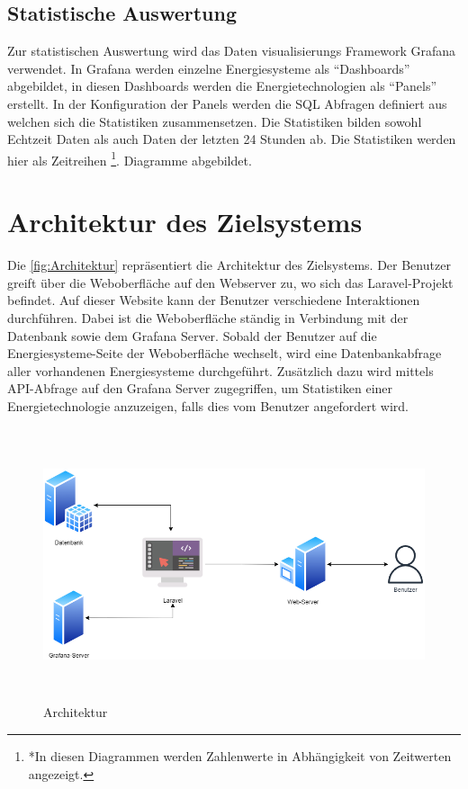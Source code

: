 \subsection{Statistische Auswertung}
Zur statistischen Auswertung wird das Daten visualisierungs Framework Grafana verwendet. In Grafana werden einzelne Energiesysteme als “Dashboards” abgebildet, in diesen Dashboards werden die Energietechnologien als “Panels” erstellt. In der Konfiguration der Panels werden die SQL Abfragen definiert aus welchen sich die Statistiken zusammensetzen. Die Statistiken bilden sowohl Echtzeit Daten als auch Daten der letzten 24 Stunden ab. Die Statistiken werden hier als Zeitreihen \footnote{ *In diesen Diagrammen werden Zahlenwerte in Abhängigkeit von Zeitwerten angezeigt.	
 }. Diagramme abgebildet.


\newpage
\section{Architektur des Zielsystems}
Die \autoref{fig:Architektur} repräsentiert die Architektur des Zielsystems. Der Benutzer greift über die Weboberfläche auf den Webserver zu, wo sich das Laravel-Projekt befindet. Auf dieser Website kann der Benutzer verschiedene Interaktionen durchführen. Dabei ist die Weboberfläche ständig in Verbindung mit der Datenbank sowie dem Grafana Server. Sobald der Benutzer auf die Energiesysteme-Seite der Weboberfläche wechselt, wird eine Datenbankabfrage aller vorhandenen Energiesysteme durchgeführt. Zusätzlich dazu wird mittels API-Abfrage auf den Grafana Server zugegriffen, um Statistiken einer Energietechnologie anzuzeigen, falls dies vom Benutzer angefordert wird.

\begin{figure}[h]
	\centering
	\includegraphics[height=8cm,width=15cm]{images/Architektur}
	\caption{Architektur}
	\label{fig:Architektur}
\end{figure}

